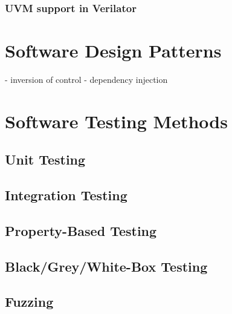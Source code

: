 \documentclass[12pt]{report}
\begin{document}
\subsubsection{UVM support in Verilator} %

\section{Software Design Patterns} %

- inversion of control
- dependency injection

\section{Software Testing Methods} %

\subsection{Unit Testing} %

\subsection{Integration Testing} %

\subsection{Property-Based Testing} %

\subsection{Black/Grey/White-Box Testing} %

\subsection{Fuzzing} %
\end{document}
